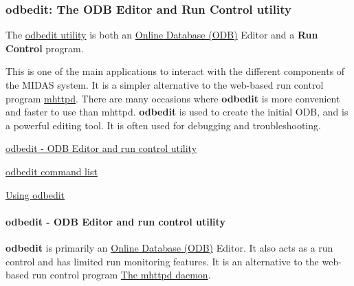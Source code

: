 \par
  \label{index_end}
\hypertarget{index_end}{}
 \subsubsection{odbedit: The ODB Editor and Run Control utility}\label{RC_odbedit}
\par
 

\par


The \hyperlink{RC_odbedit_utility}{odbedit utility} is both an \hyperlink{F_MainElements_F_Online_Database_overview}{Online Database (ODB)} Editor and a {\bfseries Run Control} program. \par
 This is one of the main applications to interact with the different components of the MIDAS system. It is a simpler alternative to the web-\/based run control program \hyperlink{RC_mhttpd_utility}{mhttpd}. There are many occasions where {\bfseries odbedit} is more convenient and faster to use than mhttpd. {\bfseries odbedit} is used to create the initial ODB, and is a powerful editing tool. It is often used for debugging and troubleshooting. \par



\begin{DoxyItemize}
\item \hyperlink{RC_odbedit_utility}{odbedit -\/ ODB Editor and run control utility}
\item \hyperlink{RC_odbedit_utility_RC_odbedit_help}{odbedit command list}
\item \hyperlink{RC_odbedit_examples}{Using odbedit}
\end{DoxyItemize}

\par
 

\par
 \label{index_end}
\hypertarget{index_end}{}
 \paragraph{odbedit -\/ ODB Editor and run control utility}\label{RC_odbedit_utility}
\label{RC_odbedit_utility_idx_odbedit-utility}
\hypertarget{RC_odbedit_utility_idx_odbedit-utility}{}
 \par
 

\par


\label{RC_odbedit_utility_idx_edit_ODB_using-odbedit}
\hypertarget{RC_odbedit_utility_idx_edit_ODB_using-odbedit}{}
 {\bfseries odbedit} is primarily an \hyperlink{F_MainElements_F_Online_Database_overview}{Online Database (ODB)} Editor. It also acts as a run control and has limited run monitoring features. It is an alternative to the web-\/based run control program \hyperlink{RC_mhttpd_utility}{The mhttpd daemon}.


